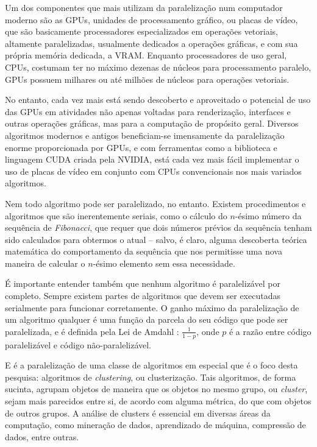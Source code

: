 \documentclass[12pt, %
openright, 
oneside, %
a4paper,    %
brazil]{facom-ufu-abntex2}
\begin{document}
Um dos componentes que mais utilizam da paralelização num computador moderno são as GPUs, unidades de processamento gráfico, ou placas de vídeo, que são basicamente processadores especializados em operações vetoriais, altamente paralelizadas, usualmente dedicados a operações gráficas, e com sua própria memória dedicada, a VRAM. Enquanto processadores de uso geral, CPUs, costumam ter no máximo dezenas de núcleos para processamento paralelo, GPUs possuem milhares ou até milhões de núcleos para operações vetoriais.

No entanto, cada vez mais está sendo descoberto e aproveitado o potencial de uso das GPUs em atividades não apenas voltadas para renderização, interfaces e outras operações gráficas, mas para a computação de propósito geral. Diversos algoritmos modernos e antigos beneficiam-se imensamente da paralelização enorme proporcionada por GPUs, e com ferramentas como a biblioteca e linguagem CUDA criada pela NVIDIA, está cada vez mais fácil implementar o uso de placas de vídeo em conjunto com CPUs convencionais nos mais variados algoritmos.

Nem todo algoritmo pode ser paralelizado, no entanto. Existem procedimentos e algoritmos que são inerentemente seriais, como o cálculo do $n$-ésimo número da sequência de \textit{Fibonacci}, que requer que dois números prévios da sequência tenham sido calculados para obtermos o atual -- salvo, é claro, alguma descoberta teórica matemática do comportamento da sequência que nos permitisse uma nova maneira de calcular o $n$-ésimo elemento sem essa necessidade.

É importante entender também que nenhum algoritmo é paralelizável por completo. Sempre existem partes de algoritmos que devem ser executadas serialmente para funcionar corretamente. O ganho máximo da paralelização de um algoritmo qualquer é uma função da parcela do seu código que pode ser paralelizada, e é definida pela Lei de Amdahl \cite{Amdahl-Law}: $\frac{1}{1-p}$, onde $p$ é a razão entre código paralelizável e código não-paralelizável.

E é a paralelização de uma classe de algoritmos em especial que é o foco desta pesquisa: algoritmos de \textit{clustering}, ou clusterização. Tais algoritmos, de forma sucinta, agrupam objetos de maneira que os objetos no mesmo grupo, ou \textit{cluster}, sejam mais parecidos entre si, de acordo com alguma métrica, do que com objetos de outros grupos. A análise de clusters é essencial em diversas áreas da computação, como mineração de dados, aprendizado de máquina, compressão de dados, entre outras.
\end{document}

